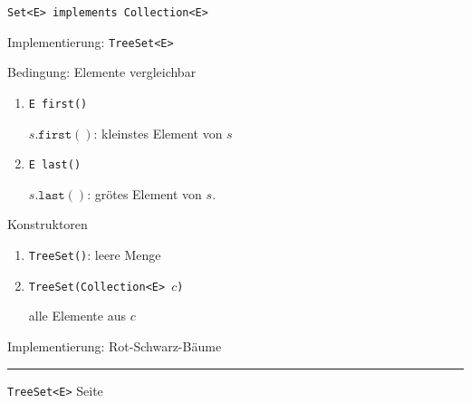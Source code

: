 \documentclass{slides}
\newcounter{mypage}
\begin{document}
\begin{slide}{}
\normalsize

\begin{center}
 \texttt{Set<E> implements Collection<E>}
\end{center}
\vspace*{0.5cm}

\footnotesize
Implementierung: \texttt{TreeSet<E>}

Bedingung: Elemente vergleichbar
\begin{enumerate}
\item \texttt{E first()}

      $s.\mathtt{first}()$: \quad kleinstes Element von $s$
\item \texttt{E last()}

      $s.\mathtt{last}()$: \quad gr\"o\3tes Element von $s$.
\end{enumerate}
Konstruktoren
\begin{enumerate}
\item \texttt{TreeSet()}: \quad leere Menge
\item \texttt{TreeSet(Collection<E> $c$)}
  
      alle Elemente aus $c$ 
\end{enumerate}
\vspace*{0.5cm}

\begin{center}
Implementierung: Rot-Schwarz-B\"aume  
\end{center}


\vspace*{\fill}
\tiny \addtocounter{mypage}{1}
\rule{17cm}{1mm}
\texttt{TreeSet<E>} \hspace*{\fill} Seite 
\end{slide}


\end{document}
